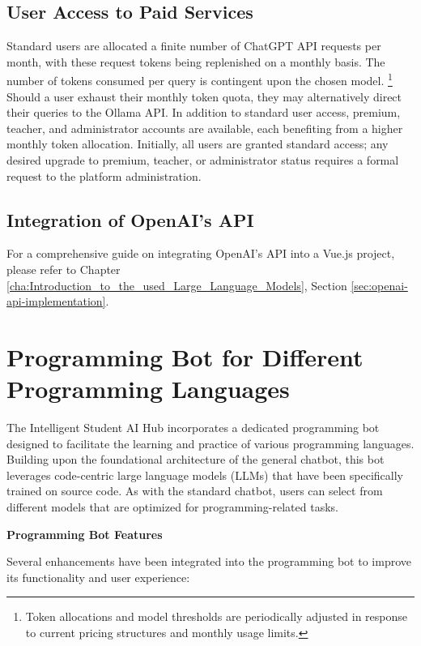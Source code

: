 \subsection{User Access to Paid Services}

Standard users are allocated a finite number of ChatGPT API requests per month, with these request tokens being replenished on a monthly basis. The number of tokens consumed per query is contingent upon the chosen model.
\footnote{Token allocations and model thresholds are periodically adjusted in response to current pricing structures and monthly usage limits.} 
Should a user exhaust their monthly token quota, they may alternatively direct their queries to the Ollama API. In addition to standard user access, premium, teacher, and administrator accounts are available, each benefiting from a higher monthly token allocation. Initially, all users are granted standard access; any desired upgrade to premium, teacher, or administrator status requires a formal request to the platform administration.

\subsection{Integration of OpenAI's API}

For a comprehensive guide on integrating OpenAI's API into a Vue.js project, please refer to Chapter \ref{cha:Introduction_to_the_used_Large_Language_Models}, Section \ref{sec:openai-api-implementation}.


\section{Programming Bot for Different Programming Languages}

The Intelligent Student AI Hub incorporates a dedicated programming bot designed to facilitate the learning and practice of various programming languages. Building upon the foundational architecture of the general chatbot, this bot leverages code-centric large language models (LLMs) that have been specifically trained on source code. As with the standard chatbot, users can select from different models that are optimized for programming-related tasks.

\textbf{Programming Bot Features}

Several enhancements have been integrated into the programming bot to improve its functionality and user experience:

